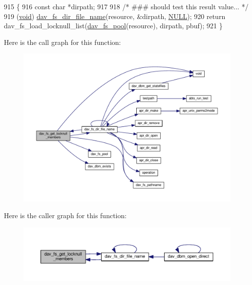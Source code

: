 \begin{DoxyCode}
915 \{
916     \textcolor{keyword}{const} \textcolor{keywordtype}{char} *dirpath;
917 
918     \textcolor{comment}{/* ### should test this result value... */}
919     (\hyperlink{group__MOD__ISAPI_gacd6cdbf73df3d9eed42fa493d9b621a6}{void}) \hyperlink{group__MOD__DAV_gae96904b2aaf9fa143f7458db22e61e77}{dav\_fs\_dir\_file\_name}(resource, &dirpath, \hyperlink{pcre_8txt_ad7f989d16aa8ca809a36bc392c07fba1}{NULL});
920     \textcolor{keywordflow}{return} dav\_fs\_load\_locknull\_list(\hyperlink{group__MOD__DAV_gabd6b3494f4de797c23cadea279f8a2b2}{dav\_fs\_pool}(resource), dirpath, pbuf);
921 \}
\end{DoxyCode}


Here is the call graph for this function\+:
\nopagebreak
\begin{figure}[H]
\begin{center}
\leavevmode
\includegraphics[width=350pt]{group__MOD__DAV_ga7346faebb4629b842fe663bf125b683b_cgraph}
\end{center}
\end{figure}




Here is the caller graph for this function\+:
\nopagebreak
\begin{figure}[H]
\begin{center}
\leavevmode
\includegraphics[width=350pt]{group__MOD__DAV_ga7346faebb4629b842fe663bf125b683b_icgraph}
\end{center}
\end{figure}


